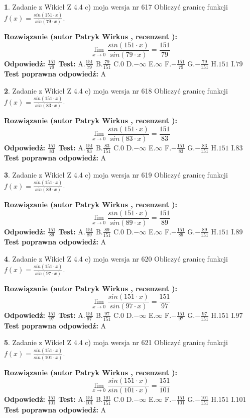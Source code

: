 \documentclass[12pt, a4paper]{article}
\theoremstyle{definition} %
\newtheorem{zad}{}
\newcommand{\zadStart}[1]{\begin{zad}#1\newline}
\newcommand{\zadStop}{\end{zad}}
\newcommand{\rozwStart}[2]{\noindent \textbf{Rozwiązanie (autor #1 , recenzent #2): }\newline}
\newcommand{\rozwStop}{\newline}
\newcommand{\odpStart}{\noindent \textbf{Odpowiedź:}\newline}
\newcommand{\odpStop}{\newline}
\newcommand{\testStart}{\noindent \textbf{Test:}\newline}
\newcommand{\testStop}{\newline}
\newcommand{\kluczStart}{\noindent \textbf{Test poprawna odpowiedź:}\newline}
\newcommand{\kluczStop}{\newline}
\begin{document}
\zadStart{Zadanie z Wikieł Z 4.4 c) moja wersja nr 617}
Obliczyć granicę funkcji $f(x)=\frac{sin(151\cdot x)}{sin(79\cdot x)}$.
\zadStop
\rozwStart{Patryk Wirkus}{}
$$\lim\limits_{x\to 0}\frac{sin(151\cdot x)}{sin(79\cdot x)}=
\frac{151}{79}$$
\rozwStop
\odpStart
$\frac{151}{79}$
\odpStop
\testStart
A.$\frac{151}{79}$
B.$\frac{79}{151}$
C.$0$
D.$-\infty$
E.$\infty$
F.$-\frac{151}{79}$
G.$-\frac{79}{151}$
H.$151$
I.$79$
\testStop
\kluczStart
A
\kluczStop



\zadStart{Zadanie z Wikieł Z 4.4 c) moja wersja nr 618}
Obliczyć granicę funkcji $f(x)=\frac{sin(151\cdot x)}{sin(83\cdot x)}$.
\zadStop
\rozwStart{Patryk Wirkus}{}
$$\lim\limits_{x\to 0}\frac{sin(151\cdot x)}{sin(83\cdot x)}=
\frac{151}{83}$$
\rozwStop
\odpStart
$\frac{151}{83}$
\odpStop
\testStart
A.$\frac{151}{83}$
B.$\frac{83}{151}$
C.$0$
D.$-\infty$
E.$\infty$
F.$-\frac{151}{83}$
G.$-\frac{83}{151}$
H.$151$
I.$83$
\testStop
\kluczStart
A
\kluczStop



\zadStart{Zadanie z Wikieł Z 4.4 c) moja wersja nr 619}
Obliczyć granicę funkcji $f(x)=\frac{sin(151\cdot x)}{sin(89\cdot x)}$.
\zadStop
\rozwStart{Patryk Wirkus}{}
$$\lim\limits_{x\to 0}\frac{sin(151\cdot x)}{sin(89\cdot x)}=
\frac{151}{89}$$
\rozwStop
\odpStart
$\frac{151}{89}$
\odpStop
\testStart
A.$\frac{151}{89}$
B.$\frac{89}{151}$
C.$0$
D.$-\infty$
E.$\infty$
F.$-\frac{151}{89}$
G.$-\frac{89}{151}$
H.$151$
I.$89$
\testStop
\kluczStart
A
\kluczStop



\zadStart{Zadanie z Wikieł Z 4.4 c) moja wersja nr 620}
Obliczyć granicę funkcji $f(x)=\frac{sin(151\cdot x)}{sin(97\cdot x)}$.
\zadStop
\rozwStart{Patryk Wirkus}{}
$$\lim\limits_{x\to 0}\frac{sin(151\cdot x)}{sin(97\cdot x)}=
\frac{151}{97}$$
\rozwStop
\odpStart
$\frac{151}{97}$
\odpStop
\testStart
A.$\frac{151}{97}$
B.$\frac{97}{151}$
C.$0$
D.$-\infty$
E.$\infty$
F.$-\frac{151}{97}$
G.$-\frac{97}{151}$
H.$151$
I.$97$
\testStop
\kluczStart
A
\kluczStop



\zadStart{Zadanie z Wikieł Z 4.4 c) moja wersja nr 621}
Obliczyć granicę funkcji $f(x)=\frac{sin(151\cdot x)}{sin(101\cdot x)}$.
\zadStop
\rozwStart{Patryk Wirkus}{}
$$\lim\limits_{x\to 0}\frac{sin(151\cdot x)}{sin(101\cdot x)}=
\frac{151}{101}$$
\rozwStop
\odpStart
$\frac{151}{101}$
\odpStop
\testStart
A.$\frac{151}{101}$
B.$\frac{101}{151}$
C.$0$
D.$-\infty$
E.$\infty$
F.$-\frac{151}{101}$
G.$-\frac{101}{151}$
H.$151$
I.$101$
\testStop
\kluczStart
A
\kluczStop
\end{document}
